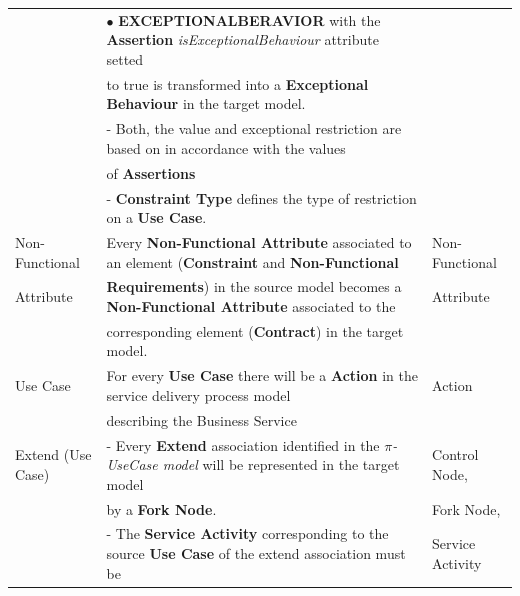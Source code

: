 \begin{table}[ht!]
\begin{tabular}{l|l|l}
      &  $\bullet$ \textbf{EXCEPTIONALBERAVIOR} with the
      \textbf{Assertion} \textit{isExceptionalBehaviour} attribute setted  & \\
      &to true is transformed into a \textbf{Exceptional Behaviour} in the target
      model.&\\


    & - Both, the  value and exceptional restriction are based on in accordance
    with the values&\\
    & of \textbf{Assertions}&\\

    & - \textbf{Constraint Type} defines the type of restriction on a
    \textbf{Use Case}. &  \\

%
%
\hline

	Non-Functional & Every \textbf{Non-Functional Attribute} associated to an
	element (\textbf{Constraint} and \textbf{Non-Functional} &
	Non-Functional \\ Attribute &  \textbf{Requirements}) in the source model
	becomes a \textbf{Non-Functional Attribute} associated to the  &
	Attribute \\
	&corresponding element (\textbf{Contract}) in the target model. &\\
\hline
    Use Case   &  For every \textbf{Use Case} there will be a
    \textbf{Action} in the service delivery process model & Action  \\
    & describing the Business Service &   \\

    \hline

    Extend (Use Case)    & - Every \textbf{Extend} association identified in the
     \textit{$\pi$-UseCase model} will be represented in the target model   & Control Node, \\
     &by a \textbf{Fork Node}.&  Fork Node,\\
      & - The \textbf{Service Activity} corresponding to the source
      \textbf{ Use Case} of the extend association must be  & Service
      Activity
    \\


\end{tabular}
\end{table}

